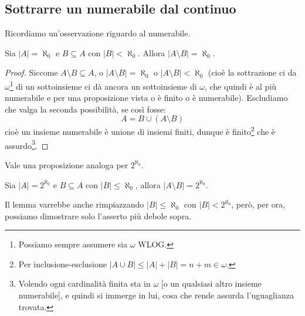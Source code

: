 \documentclass[11pt]{scrartcl}
\begin{document}
\subsection{Sottrarre un  numerabile dal continuo}
Ricordiamo un'osservazione riguardo al numerabile.

\begin{remark}[Numerabile - finito = numerabile]
	Sia $|A| = \aleph_0$ e $B \subseteq A$ con $|B|<\aleph_0$. Allora $|A \setminus B| = \aleph_0$.
\end{remark}

\begin{proof}
	Siccome $A \setminus B \subseteq A$, o $|A \setminus B| = \aleph_0$ o $|A \setminus B|<\aleph_0$ (cioè la sottrazione ci da $\omega$\footnote{Possiamo sempre assumere sia $\omega$ WLOG.} di un sottoinsieme ci dà 
	ancora un sottoinsieme di $\omega$, che quindi è al più numerabile e per una proposizione vista o è finito o è numerabile). Escludiamo che valga la seconda possibilità, se così fosse:
	\[ A = B \cup (A \setminus B)
		\]
	cioè un insieme numerabile è unione di insiemi finiti, dunque è finito\footnote{Per inclusione-esclusione $|A \cup B| \leq |A| + |B| = n + m \in \omega$.} che è assurdo\footnote{Volendo ogni cardinalità finita sta in $\omega$ [o un qualsiasi altro insieme numerabile], e quindi si immerge in lui, cosa che rende assurda l'uguaglianza trovata.}.
\end{proof}

Vale una proposizione analoga per $2^{\aleph_0}$.

\begin{lemma}[Continuo - al più numerabile = continuo]
	Sia $|A| = 2^{\aleph_0}$ e $B \subseteq A$ con $|B| \leq \aleph_0$, allora $|A \setminus B| = 2^{\aleph_0}$.
\end{lemma}

\begin{note}[Continuo - al più continuo (escluso) = continuo]
	Il lemma varrebbe anche rimpiazzando $|B| \leq \aleph_0$ con $|B| < 2^{\aleph_0}$, però, per ora, possiamo dimostrare solo l'asserto più debole sopra.
\end{note}
\end{document}
